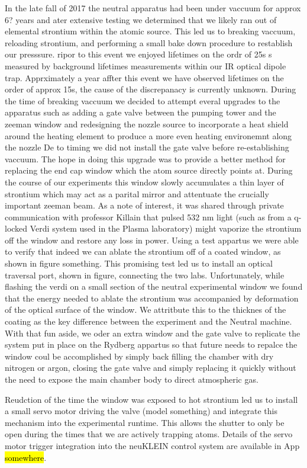 In the late fall of 2017 the neutral apparatus had been under vaccuum for approx 6? years and ater extensive testing we determined that we likely ran out of elemental strontium within the atomic source. This led us to breaking vaccuum, reloading strontium, and performing a small bake down procedure to restablish our presssure. ripor to this event we enjoyed lifetimes on the ordr of 25s s measured by background lifetimes measurements within our IR optical dipole trap. Apprximately a year affter this event we have observed lifetimes on the order of approx 15s, the cause of the discrepanacy is currently unknown.
During the time of breaking vaccuum we decided to attempt everal upgrades to the apparatus such as adding a gate valve between the pumping tower and the zeeman window and redesigning the nozzle source to incorporate a heat shield around the heating element to produce a more even heating environemnt along the nozzle
De to timing we did not install the gate valve before re-establishing vaccuum. The hope in doing this upgrade was to provide a better method for replacing the end cap window which the atom source directly points at. During the course of our experiments this window slowly accumulates a thin layer of strontium which may act as a parital mirror and attentuate the crucially important zeeman beam. As a note of interest, it was shared through private communication with professor Killain that pulsed 532 nm light (such as from a q-locked Verdi system used in the Plasma laboratory) might vaporize the strontium off the window and restore any loss in power. Using a test appartus we were able to verify that indeed we can ablate the strontium off of a coated window, as shown in figure something.
This promising test led us to install an optical traversal port, shown in figure, connecting the two labs. Unfortunately, while flashing the verdi on a small section of the neutral experimental window we found that the energy needed to ablate the strontium was accompanied by deformation of the optical surface of the window. We attritbute this to the thicknes of the coating as the key difference between the experiment and the Neutral machine.
With that fun aside, we oder an extra window and the gate valve to replicate the system put in place on the Rydberg appartus so that future needs to repalce the window coul be accomplished by simply back filling the chamber with dry nitrogen or argon, closing the gate valve and simply replacing it quickly without the need to expose the main chamber body to direct atmospheric gas. 

Reudction of the time the window was exposed to hot strontium led us to install a small servo motor driving the valve (model something) and integrate this mechanism into the experimental runtime. This allows the shutter to only be open during the times that we are actively trapping atoms. Details of the servo motor trigger integration into the neuKLEIN control system are available in App \hl{somewhere}.

